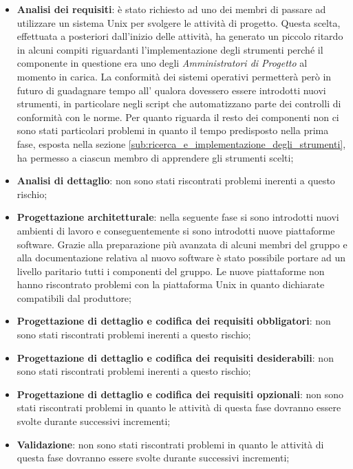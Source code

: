 			\begin{itemize}
				\item \textbf{Analisi dei requisiti}: è stato richiesto ad uno dei membri di passare ad utilizzare un sistema Unix per svolgere le attività di progetto. Questa scelta, effettuata a posteriori dall'inizio delle attività, ha generato un piccolo ritardo in alcuni compiti riguardanti l'implementazione degli strumenti perché il componente in questione era uno degli \emph{Amministratori di Progetto} al momento in carica. \newline
				La conformità dei sistemi operativi permetterà però in futuro di guadagnare tempo all'\roleAdministrator{} qualora dovessero essere introdotti nuovi strumenti, in particolare negli script che automatizzano parte dei controlli di conformità con le norme. \newline
				Per quanto riguarda il resto dei componenti non ci sono stati particolari problemi in quanto il tempo predisposto nella prima fase, esposta nella sezione \ref{sub:ricerca_e_implementazione_degli_strumenti}, ha permesso a ciascun membro di apprendere gli strumenti scelti;
				\item \textbf{Analisi di dettaglio}: non sono stati riscontrati problemi inerenti a questo rischio;
				\item \textbf{Progettazione architetturale}: nella seguente fase si sono introdotti nuovi ambienti di lavoro e conseguentemente si sono introdotti nuove piattaforme software. Grazie alla preparazione più avanzata di alcuni membri del gruppo e alla documentazione relativa al nuovo software è stato possibile portare ad un livello paritario tutti i componenti del gruppo. Le nuove piattaforme non hanno riscontrato problemi con la piattaforma Unix in quanto dichiarate compatibili dal produttore;
				\item \textbf{Progettazione di dettaglio e codifica dei requisiti obbligatori}: non sono stati riscontrati problemi inerenti a questo rischio;
				\item \textbf{Progettazione di dettaglio e codifica dei requisiti desiderabili}: non sono stati riscontrati problemi inerenti a questo rischio;
				\item \textbf{Progettazione di dettaglio e codifica dei requisiti opzionali}: non sono stati riscontrati problemi in quanto le attività di questa fase dovranno essere svolte durante successivi incrementi;
				\item \textbf{Validazione}: non sono stati riscontrati problemi in quanto le attività di questa fase dovranno essere svolte durante successivi incrementi;
			\end{itemize}


